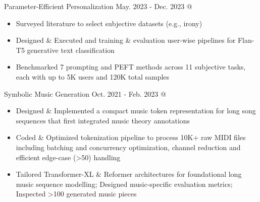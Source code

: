 \cveventSameLine{}
    {Parameter-Efficient Personalization}
    {May. 2023 - Dec. 2023}{ @ }{}
\begin{itemize}

    \item Surveyed literature to select subjective datasets (e.g., irony)

    \item Designed \& Executed  and 
    training \& evaluation user-wise pipelines for Flan-T5 generative text classification

    \item Benchmarked 7 prompting and PEFT methods across 11 subjective tasks, each with up to 5K users and 120K total samples
\end{itemize}
\dividerSmall




\cveventSameLine{}
    {Symbolic Music Generation}
    {Oct. 2021 - Feb. 2023}{ @ }
\begin{itemize}

    \item Designed \& Implemented a compact music token representation for long song sequences that first integrated
    music theory annotations

    \item Coded \& Optimized tokenization pipeline to process 10K+ raw MIDI files including batching and concurrency optimization, channel reduction and efficient edge-case (>50) handling

    \item Tailored Transformer-XL \& Reformer architectures for foundational long music sequence modelling; Designed music-specific evaluation metrics; Inspected >100 generated music pieces
\end{itemize}
\dividerSmall




